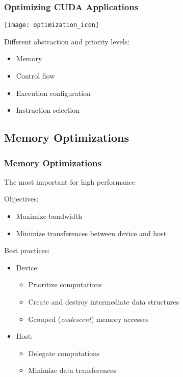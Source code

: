 \documentclass[10pt, compress]{beamer}
\begin{document}
\begin{frame}
    \frametitle{Optimizing CUDA Applications}
    \begin{center}
        \texttt{[image: optimization\_icon]}
    \end{center}

    Different \alert{abstraction} and \alert{priority} levels:
    \pause
    \begin{itemize}
        \item Memory
            \pause
        \item Control flow
            \pause
        \item Execution configuration
            \pause
        \item Instruction selection
    \end{itemize}
\end{frame}

\subsection{Memory Optimizations}

\begin{frame}
    \frametitle{Memory Optimizations}
    The \alert{most important} for \alert{high performance}
    \pause

    Objectives:
    \begin{itemize}
        \item Maximize \alert{bandwidth}
            \pause
        \item Minimize \alert{transferences} between device and host
            \pause
    \end{itemize}

    Best practices:
    \pause

    \begin{itemize}
        \item Device:
            \pause
            \begin{itemize}
                \item Prioritize \alert{computations}
                    \pause
                \item Create and destroy \alert{intermediate data structures}
                    \pause
                \item \alert{Grouped} (\textit{coalescent}) memory accesses
            \end{itemize}
            \pause
        \item Host:
            \pause
            \begin{itemize}
                \item Delegate \alert{computations}
                    \pause
                \item Minimize \alert{data transferences}
            \end{itemize}
    \end{itemize}
\end{frame}
\end{document}
